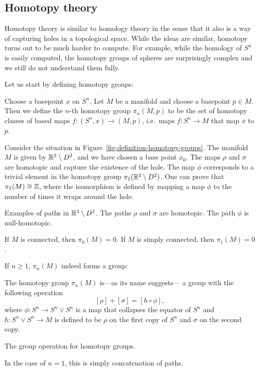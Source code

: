 \subsection*{Homotopy theory}
Homotopy theory is similar to homology theory in the sense that it also is a way of capturing holes in a topological space.
While the ideas are similar, homotopy turns out to be much harder to compute.
For example, while the homology of $S^{n}$ is easily computed, the homotopy groups of spheres are surprisingly complex and we still do not understand them fully.

Let us start by defining homotopy groups:

\begin{definition}
    Choose a basepoint $x$ on $S^{n}$.
    Let $M$ be a manifold and choose a basepoint $p \in M$.
    Then we define the $n$-th homotopy group $\pi_n(M, p)$ to be the set of homotopy classes of based maps  $f: (S^{n}, x) \to  (M, p)$, i.e.\ maps $f: S^{n} \to  M$ that map $x$ to $p$.
\end{definition}
\begin{eg}
    Consider the situation in Figure~\ref{fig:definition-homotopy-groups}.
    The manifold $M$ is given by $\mathbb{R}^2 \setminus D^2$, and we have chosen a base point $x_0$.
    The maps $\rho$ and  $\sigma$ are homotopic and capture the existence of the hole.
    The map $\phi$ corresponds to a trivial element in the homotopy group  $\pi_1(\mathbb{R}^2 \setminus D^2)$.
    One can prove that $\pi_1(M) \cong \mathbb{Z}$, where the isomorphism is defined by mapping a map $\phi$ to the number of times it wraps around the hole.
\end{eg}
\begin{marginfigure}
    \centering
    \caption{Examples of paths in $\mathbb{R}^2 \setminus D^2$. The paths $\rho$ and $\sigma$ are homotopic. The path $\phi$ is null-homotopic.}
    \label{fig:definition-homotopy-groups}
\end{marginfigure}
\begin{eg}
    If $M$ is connected, then  $\pi_0(M) = 0$.
    If  $M$ is simply connected, then  $\pi_1(M) = 0$.
\end{eg}

If $n \ge  1$, $\pi_n(M)$ indeed forms a group:
\begin{prop}
    The homotopy group $\pi_n(M)$ is---as its name suggests--- a group with the following operation
    \[
        [\rho] + [\sigma] = [h  \circ  \phi]
    ,\] 
    where $\phi : S^{n} \to  S^{n} \vee S^{n}$ is a map that collapses the equator of $S^{n}$ and $h : S^{n} \vee S^{n} \to  M$ is defined to be $\rho$ on the first copy of  $S^{n}$ and $\sigma$ on the second copy.
\end{prop}
\begin{marginfigure}
    \centering
    \caption{The group operation for homotopy groups.}
    \label{fig:fundamental-group-operation}
\end{marginfigure}
\begin{remark}
    In the case of $n=1$, this is simply concatenation of paths.
\end{remark}

